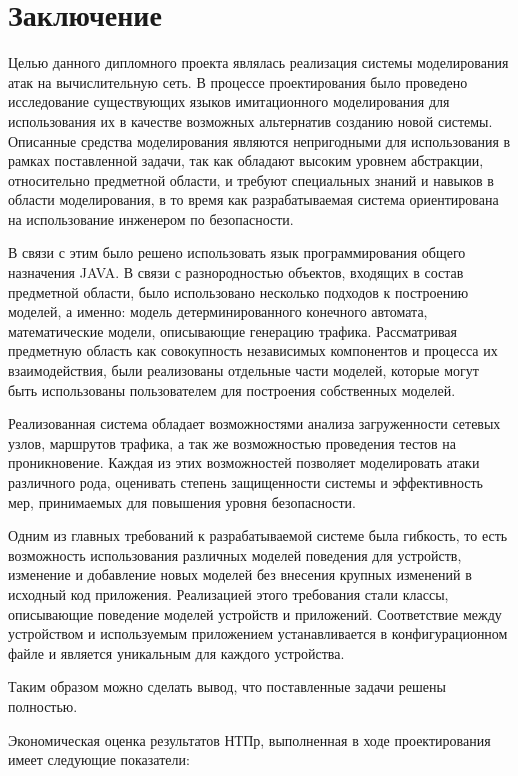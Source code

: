 \newpage 
\chapter*{Заключение}

   Целью данного дипломного проекта являлась реализация системы моделирования атак на вычислительную сеть. В процессе проектирования было проведено исследование существующих языков имитационного моделирования для использования их в качестве возможных альтернатив созданию новой системы. Описанные средства моделирования являются непригодными для использования в рамках поставленной задачи, так как обладают высоким уровнем абстракции, относительно предметной области, и требуют специальных знаний и навыков в области моделирования, в то время как разрабатываемая система ориентирована на использование инженером по безопасности. 
   
   В связи с этим было решено использовать язык программирования общего назначения JAVA. В связи с разнородностью объектов, входящих в состав предметной области, было использовано несколько подходов к построению моделей, а именно: модель детерминированного конечного автомата, математические модели, описывающие генерацию трафика. Рассматривая предметную область как совокупность независимых компонентов и процесса их взаимодействия, были реализованы отдельные части моделей, которые могут быть использованы пользователем для построения собственных моделей. 
   
   Реализованная система обладает возможностями анализа загруженности сетевых узлов, маршрутов трафика, а так же возможностью проведения тестов на проникновение. Каждая из этих возможностей позволяет моделировать атаки различного рода, оценивать степень защищенности системы и эффективность мер, принимаемых для повышения уровня безопасности. 
   
   Одним из главных требований к разрабатываемой системе была гибкость, то есть возможность использования различных моделей поведения для устройств, изменение и добавление новых моделей без внесения крупных изменений в исходный код приложения. Реализацией этого требования стали классы, описывающие поведение моделей устройств и приложений. Соответствие между устройством и используемым приложением устанавливается в конфигурационном файле и является уникальным для каждого устройства.
   
    Таким образом можно сделать вывод, что поставленные задачи решены полностью. 
    
    Экономическая оценка результатов НТПр, выполненная в ходе проектирования имеет следующие показатели:
    
